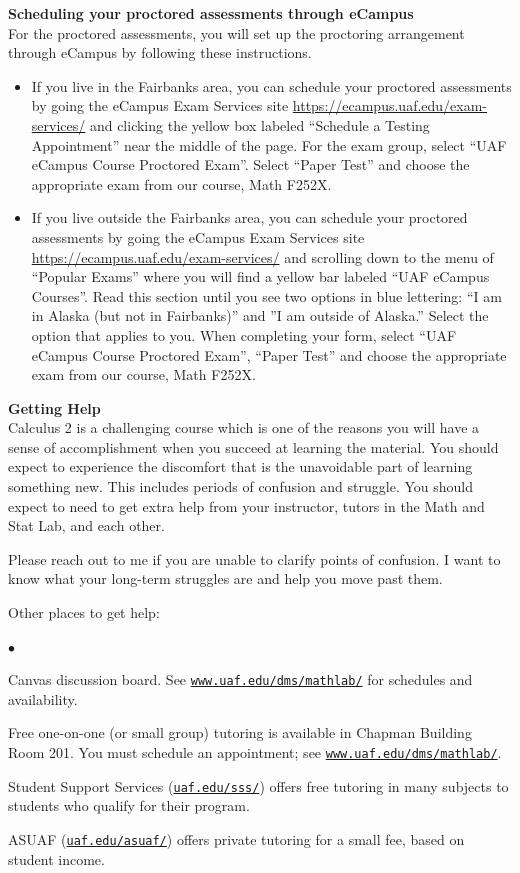 \documentclass[12pt]{article}
\renewcommand{\emph}[1]{\textsf{\textbf{#1}}}
\newcommand{\localhead}[1]{\par\smallskip\textbf{#1} \smallskip\nobreak\\}%
\def\heading#1{\localhead{\large\emph{#1}}}
\newenvironment{clist}%
{\bgroup\parskip 0pt\begin{list}{$\bullet$}{\partopsep 4pt\topsep 0pt\itemsep -2pt}}%
{\end{list}\egroup}%
\begin{document}
\heading{Scheduling your proctored assessments through eCampus}
For the proctored assessments, you will set up the proctoring arrangement through eCampus by following these instructions.
\begin{itemize}
\item If you live in the Fairbanks area, you can schedule your proctored assessments by going
the eCampus Exam Services site \href{https://ecampus.uaf.edu/exam-services/}{https://ecampus.uaf.edu/exam-services/} and clicking
the yellow box labeled “Schedule a Testing Appointment” near the middle of the page.
For the exam group, select “UAF eCampus Course Proctored Exam”. Select “Paper Test”
and choose the appropriate exam from our course, Math F252X.
\item If you live outside the Fairbanks area, you can schedule your proctored assessments by
going the eCampus Exam Services site \href{https://ecampus.uaf.edu/exam-services/}{https://ecampus.uaf.edu/exam-services/} and
scrolling down to the menu of “Popular Exams” where you will find a yellow bar labeled
“UAF eCampus Courses”. Read this section until you see two options in blue lettering: “I
am in Alaska (but not in Fairbanks)” and ”I am outside of Alaska.” Select the option that
applies to you. When completing your form, select “UAF eCampus Course Proctored
Exam”, “Paper Test” and choose the appropriate exam from our course, Math F252X.
\end{itemize}
\heading{Getting Help}
Calculus 2 is a challenging course which is one of the reasons you will have a sense of accomplishment when you succeed at learning the material. You should expect to experience the discomfort that is the unavoidable part of learning something new. This includes periods of confusion and struggle. You should expect to need to get extra help from your instructor, tutors in the Math and Stat Lab, and each other. 

Please reach out to me if you are unable to clarify points of confusion. I want to know what your long-term struggles are and help you move past them.

Other places to get help: 

\begin{clist}
	\item Canvas discussion board.
	See 
	\href{http://www.uaf.edu/dms/mathlab/}{\texttt{www.uaf.edu/dms/mathlab/}} for schedules and availability.
	\item Free
one-on-one (or small group) tutoring is available in 
Chapman Building Room 201. You must schedule an
appointment; see \href{http://www.uaf.edu/dms/mathlab/}{\texttt{www.uaf.edu/dms/mathlab/}}.
	\item Student Support Services (\href{https://uaf.edu/sss/}{\texttt{uaf.edu/sss/}}) offers free tutoring in many subjects to students who qualify for their program.
	\item ASUAF (\href{https://uaf.edu/asuaf/}{\texttt{uaf.edu/asuaf/}}) offers private tutoring for a small fee, based on student income.
\end{clist}
\end{document}
